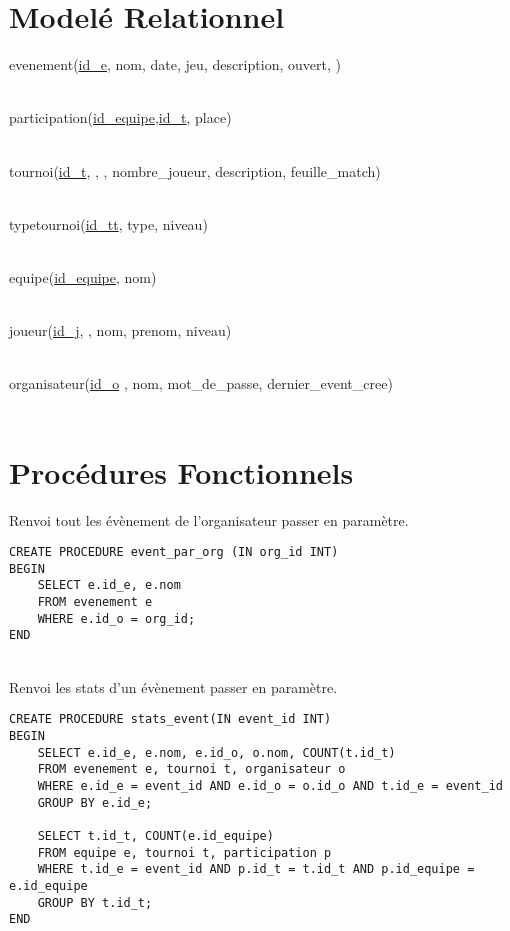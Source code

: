\documentclass{article}
\begin{document}
\section{Modelé Relationnel}

{\large\parindent 1pt
evenement(\underline{id\_e}, nom, date, jeu, description, ouvert, )\\~

participation(\underline{id\_equipe},\underline{id\_t}, place)\\~

tournoi(\underline{id\_t}, , , nombre\_joueur, description, feuille\_match)\\~

typetournoi(\underline{id\_tt}, type, niveau)\\~

equipe(\underline{id\_equipe}, nom)\\~

joueur(\underline{id\_j}, , nom, prenom, niveau)\\~

organisateur(\underline{id\_o} , nom, mot\_de\_passe, dernier\_event\_cree)\\~
}
\section{Procédures Fonctionnels}
Renvoi tout les évènement de l'organisateur passer en paramètre.
\begin{verbatim}
CREATE PROCEDURE event_par_org (IN org_id INT)
BEGIN
    SELECT e.id_e, e.nom
    FROM evenement e
    WHERE e.id_o = org_id;
END
\end{verbatim}
~\\
Renvoi les stats d'un évènement passer en paramètre.
\begin{verbatim}
CREATE PROCEDURE stats_event(IN event_id INT)
BEGIN
    SELECT e.id_e, e.nom, e.id_o, o.nom, COUNT(t.id_t)
    FROM evenement e, tournoi t, organisateur o
    WHERE e.id_e = event_id AND e.id_o = o.id_o AND t.id_e = event_id
    GROUP BY e.id_e;
    
    SELECT t.id_t, COUNT(e.id_equipe)
    FROM equipe e, tournoi t, participation p
    WHERE t.id_e = event_id AND p.id_t = t.id_t AND p.id_equipe = e.id_equipe
    GROUP BY t.id_t;
END
\end{verbatim}
\end{document}
